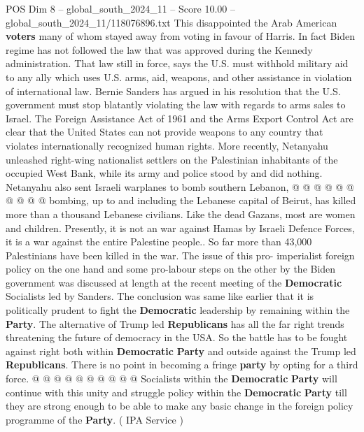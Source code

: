 \begin{textsample}{POS Dim 8 – global\_south\_2024\_11 – Score 10.00 – global\_south\_2024\_11/118076896.txt}
This disappointed the Arab American \textbf{voters} many of whom stayed away from voting in favour of Harris.
In fact Biden regime has not followed the law that was approved during the Kennedy administration.
That law still in force, says the U.S. must withhold military aid to any ally which uses U.S. arms, aid, weapons, and other assistance in violation of international law.
Bernie Sanders has argued in his resolution that the U.S. government must stop blatantly violating the law with regards to arms sales to Israel.
The Foreign Assistance Act of 1961 and the Arms Export Control Act are clear that the United States can not provide weapons to any country that violates internationally recognized human rights.
More recently, Netanyahu unleashed right-wing nationalist settlers on the Palestinian inhabitants of the occupied West Bank, while its army and police stood by and did nothing.
Netanyahu also sent Israeli warplanes to bomb southern Lebanon, @ @ @ @ @ @ @ @ @ @ bombing, up to and including the Lebanese capital of Beirut, has killed more than a thousand Lebanese civilians.
Like the dead Gazans, most are women and children.
Presently, it is not an war against Hamas by Israeli Defence Forces, it is a war against the entire Palestine people..
So far more than 43,000 Palestinians have been killed in the war.
The issue of this pro- imperialist foreign policy on the one hand and some pro-labour steps on the other by the Biden government was discussed at length at the recent meeting of the \textbf{Democratic} Socialists led by Sanders.
The conclusion was same like earlier that it is politically prudent to fight the \textbf{Democratic} leadership by remaining within the \textbf{Party}.
The alternative of Trump led \textbf{Republicans} has all the far right trends threatening the future of democracy in the USA.
So the battle has to be fought against right both within \textbf{Democratic} \textbf{Party} and outside against the Trump led \textbf{Republicans}.
There is no point in becoming a fringe \textbf{party} by opting for a third force. @ @ @ @ @ @ @ @ @ @ Socialists within the \textbf{Democratic} \textbf{Party} will continue with this unity and struggle policy within the \textbf{Democratic} \textbf{Party} till they are strong enough to be able to make any basic change in the foreign policy programme of the \textbf{Party}. ( IPA Service )

\end{textsample}
